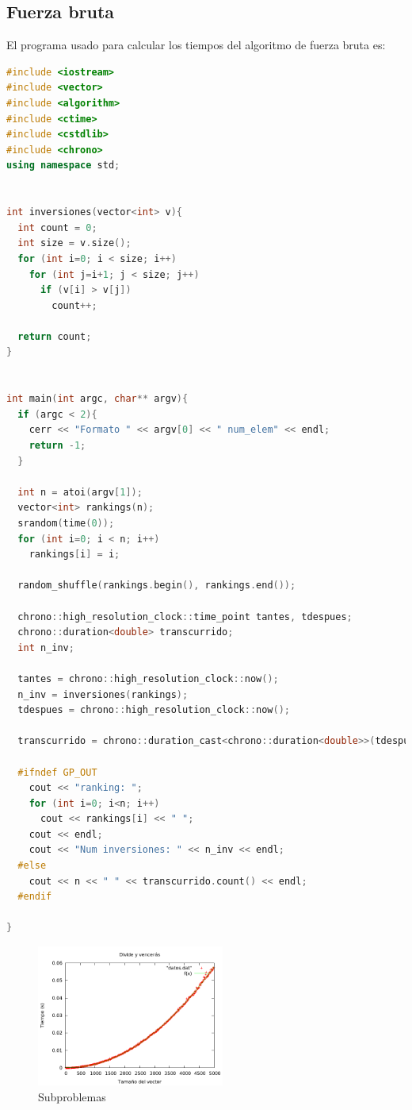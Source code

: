 \subsection{Fuerza bruta}
El programa usado para calcular los tiempos del algoritmo de fuerza bruta es:
\begin{lstlisting}[language=c++]
#include <iostream>
#include <vector>
#include <algorithm>
#include <ctime>
#include <cstdlib>
#include <chrono>
using namespace std;


int inversiones(vector<int> v){
  int count = 0;
  int size = v.size();
  for (int i=0; i < size; i++)
    for (int j=i+1; j < size; j++)
      if (v[i] > v[j])
        count++;

  return count;
}


int main(int argc, char** argv){
  if (argc < 2){
    cerr << "Formato " << argv[0] << " num_elem" << endl;
    return -1;
  }

  int n = atoi(argv[1]);
  vector<int> rankings(n);
  srandom(time(0));
  for (int i=0; i < n; i++)
    rankings[i] = i;

  random_shuffle(rankings.begin(), rankings.end());

  chrono::high_resolution_clock::time_point tantes, tdespues;
  chrono::duration<double> transcurrido;
  int n_inv;

  tantes = chrono::high_resolution_clock::now();
  n_inv = inversiones(rankings);
  tdespues = chrono::high_resolution_clock::now();

  transcurrido = chrono::duration_cast<chrono::duration<double>>(tdespues - tantes);

  #ifndef GP_OUT
    cout << "ranking: ";
    for (int i=0; i<n; i++)
      cout << rankings[i] << " ";
    cout << endl;
    cout << "Num inversiones: " << n_inv << endl;
  #else
    cout << n << " " << transcurrido.count() << endl;
  #endif

}
\end{lstlisting}

\begin{figure}[htb] 
\centering
	\includegraphics[width=0.55\textwidth]{../Opcional/Graficas/dyv_bruno.png}
	\caption{Subproblemas} 
	\label{fig:perros} 
\end{figure}


